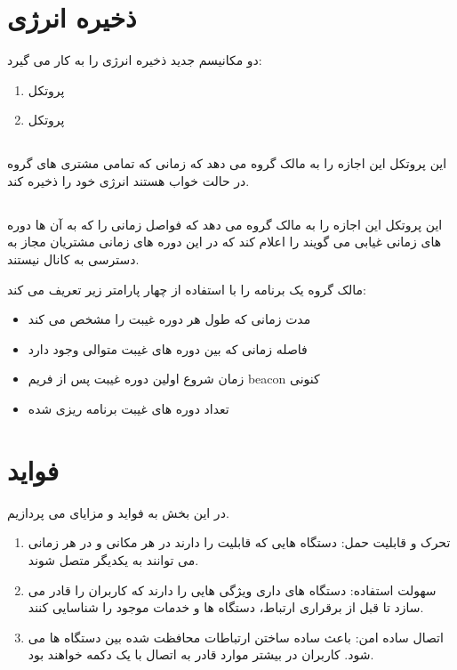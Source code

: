 \section{ذخیره انرژی}
دو مکانیسم جدید ذخیره انرژی را به کار می گیرد:
\begin{enumerate}
	\item پروتکل 
	\item پروتکل 
	
\end{enumerate}
\subsection{}
این پروتکل این اجازه را به مالک گروه می دهد که زمانی که تمامی مشتری های گروه در حالت خواب
هستند انرژی خود را ذخیره کند.

\subsection{}
این پروتکل این اجازه را به مالک گروه می دهد که فواصل زمانی را که به آن ها دوره های زمانی غیابی می گویند را اعلام کند که در این دوره های زمانی مشتریان مجاز به دسترسی به کانال نیستند.

مالک گروه یک برنامه
  را با استفاده از چهار پارامتر زیر تعریف می کند:
  \begin{itemize}
  	\item مدت زمانی که طول هر دوره غیبت را مشخص می کند
  	\item فاصله زمانی که بین دوره های غیبت متوالی وجود دارد
  	\item زمان شروع اولین دوره غیبت پس از فریم beacon کنونی
  	\item تعداد دوره های غیبت برنامه ریزی شده
  \end{itemize}




\section{فواید}
در این بخش به فواید و مزایای 
می پردازیم.
\begin{enumerate}
	\item تحرک و قابلیت حمل: دستگاه هایی که قابلیت 
	را دارند در هر مکانی و در هر زمانی می توانند به یکدیگر متصل شوند.
	\item سهولت استفاده: دستگاه های داری 
 ویژگی هایی را دارند که کاربران را قادر می سازد تا قبل از برقراری ارتباط، دستگاه ها و خدمات موجود را شناسایی کنند.
     \item اتصال ساده امن: 
      باعث ساده ساختن ارتباطات محافظت شده بین دستگاه ها می شود. کاربران در بیشتر موارد قادر به اتصال با یک دکمه خواهند بود.
\end{enumerate}

